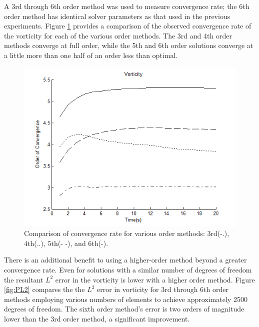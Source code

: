 \documentclass[letterpaper,12pt]{report}
\begin{document}
A 3rd through 6th order method was used to measure convergence rate; the 6th order method has identical solver parameters as that used in the previous experiments. Figure \ref{fig:Porder} provides a comparison of the observed convergence rate of the vorticity for each of the various order methods. The 3rd and 4th order methods converge at full order, while the 5th and 6th order solutions converge at a little more than one half of an order less than optimal.

\begin{figure}
\centering
\includegraphics[width=1\textwidth]{Porder.PNG}
\caption{\label{fig:Porder}Comparison of convergence rate for various order methods: 3rd(-.), 4th(..), 5th(- -), and 6th(-).}
\end{figure}

There is an additional benefit to using a higher-order method beyond a greater convergence rate. Even for solutions with a similar number of degrees of freedom the resultant $L^2$ error in the vorticity is lower with a higher order method. Figure \ref{fig:PL2} compares the the $L^2$ error in vorticity for 3rd through 6th order methods employing various numbers of elements to achieve approximately 2500 degrees of freedom. The sixth order method's error is two orders of magnitude lower than the 3rd order method, a significant improvement.
\end{document}
